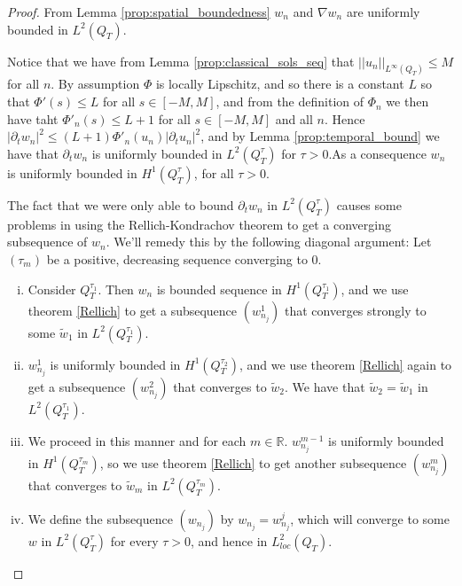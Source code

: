 \documentclass[11pt, a4paper]{article}
\begin{document}
\begin{proof}
From Lemma \ref{prop:spatial_boundedness} $w_n$ and $\nabla w_n$ are uniformly bounded in $L^2(Q_T)$.

Notice that we have from Lemma \ref{prop:classical_sols_seq} that $||u_n||_{L^\infty(Q_T)} \leq M$ for all $n$. By assumption $\Phi$ is locally Lipschitz, and so there is a constant $L$ so that $\Phi'(s) \leq L$ for all $s \in [-M, M]$, and from the definition of $\Phi_n$ we then have taht $\Phi'_n(s) \leq L+1$ for all $s\in [-M,M]$ and all $n$. Hence $|\partial_t w_n|^2 \leq  (L+1)\Phi'_n(u_n)|\partial_t u_n|^2$, and by Lemma \ref{prop:temporal_bound} we have that $\partial_t w_n$ is uniformly bounded in $L^2(Q_T^\tau)$ for $\tau > 0$.As a consequence $w_n$ is uniformly bounded in $H^1(Q_T^\tau)$, for all $\tau > 0$.

 The fact that we were only able to bound $\partial_t w_n$ in $L^2(Q_T^\tau)$ causes some problems in using the Rellich-Kondrachov theorem to get a converging subsequence of $w_n$. We'll remedy this by the following diagonal argument:
	Let $(\tau_m)$ be a positive, decreasing sequence converging to $0$.
	\begin{enumerate}[i)]
	\item Consider $Q_T^{\tau_1}$. Then $w_n$ is bounded sequence in $H^1(Q_T^{\tau_1})$, and we use theorem \ref{Rellich} to get a subsequence $(w_{n_j}^1)$ that converges strongly to some $\tilde{w}_1$ in $L^2(Q_T^{\tau_1})$.
	
	\item $w_{n_j}^1$ is uniformly bounded in $H^1(Q_T^{\tau_2})$, and we use theorem \ref{Rellich} again to get a subsequence $(w_{n_j}^2)$ that converges to $\tilde{w}_2$. We have that $\tilde{w}_2 = \tilde{w}_1$ in $L^2(Q_T^{\tau_1})$.
	
	\item We proceed in this manner and for each $m \in \mathbb{R}$. $w_{n_j}^{m-1}$ is uniformly bounded in $H^1(Q_T^{\tau_m})$, so we use theorem \ref{Rellich} to get another subsequence $(w_{n_j}^m)$ that converges to $\tilde{w}_m$ in $L^2(Q_T^{\tau_m})$.
	
	\item We define the subsequence $(w_{n_j})$ by $w_{n_j} = w_{n_j}^j$, which will converge to some $w$ in $L^2(Q_T^\tau)$ for every $\tau > 0$, and hence in $L^2_{loc}(Q_T)$.


\end{enumerate}
\end{proof}
\end{document}
